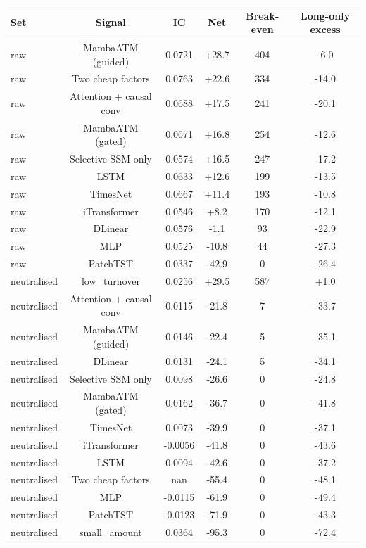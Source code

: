 {\scriptsize
\setlength{\tabcolsep}{2pt}
\begin{tabular}{lccccc}
\toprule
\textbf{Set} & \textbf{Signal} & \textbf{IC} & \textbf{Net} & \textbf{Break-even} & \textbf{Long-only excess} \\
\midrule
raw & MambaATM (guided) & 0.0721 & +28.7 & 404 & -6.0 \\
raw & Two cheap factors & 0.0763 & +22.6 & 334 & -14.0 \\
raw & Attention + causal conv & 0.0688 & +17.5 & 241 & -20.1 \\
raw & MambaATM (gated) & 0.0671 & +16.8 & 254 & -12.6 \\
raw & Selective SSM only & 0.0574 & +16.5 & 247 & -17.2 \\
raw & LSTM & 0.0633 & +12.6 & 199 & -13.5 \\
raw & TimesNet & 0.0667 & +11.4 & 193 & -10.8 \\
raw & iTransformer & 0.0546 & +8.2 & 170 & -12.1 \\
raw & DLinear & 0.0576 & -1.1 & 93 & -22.9 \\
raw & MLP & 0.0525 & -10.8 & 44 & -27.3 \\
raw & PatchTST & 0.0337 & -42.9 & 0 & -26.4 \\
neutralised & low\_turnover & 0.0256 & +29.5 & 587 & +1.0 \\
neutralised & Attention + causal conv & 0.0115 & -21.8 & 7 & -33.7 \\
neutralised & MambaATM (guided) & 0.0146 & -22.4 & 5 & -35.1 \\
neutralised & DLinear & 0.0131 & -24.1 & 5 & -34.1 \\
neutralised & Selective SSM only & 0.0098 & -26.6 & 0 & -24.8 \\
neutralised & MambaATM (gated) & 0.0162 & -36.7 & 0 & -41.8 \\
neutralised & TimesNet & 0.0073 & -39.9 & 0 & -37.1 \\
neutralised & iTransformer & -0.0056 & -41.8 & 0 & -43.6 \\
neutralised & LSTM & 0.0094 & -42.6 & 0 & -37.2 \\
neutralised & Two cheap factors & nan & -55.4 & 0 & -48.1 \\
neutralised & MLP & -0.0115 & -61.9 & 0 & -49.4 \\
neutralised & PatchTST & -0.0123 & -71.9 & 0 & -43.3 \\
neutralised & small\_amount & 0.0364 & -95.3 & 0 & -72.4 \\
\bottomrule
\end{tabular}
}
